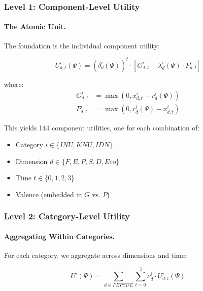 \subsubsection{Level 1: Component-Level Utility}

\paragraph{The Atomic Unit.}
The foundation is the individual component utility:

\begin{equation}
\boxed{
U^i_{d,t}(\Psi) = \left(\delta^i_d(\Psi)\right)^t \cdot \left[ G^i_{d,t} - \lambda^i_d(\Psi) \cdot P^i_{d,t} \right]
}
\label{eq:component-utility}
\end{equation}

where:
\begin{align*}
G^i_{d,t} &= \max\left(0, x^i_{d,t} - r^i_d(\Psi)\right) \\
P^i_{d,t} &= \max\left(0, r^i_d(\Psi) - x^i_{d,t}\right)
\end{align*}

This yields 144 component utilities, one for each combination of:
\begin{itemize}
\item Category $i \in \{INU, KNU, IDN\}$
\item Dimension $d \in \{F, E, P, S, D, Eco\}$
\item Time $t \in \{0, 1, 2, 3\}$
\item Valence (embedded in $G$ vs. $P$)
\end{itemize}

\subsubsection{Level 2: Category-Level Utility}

\paragraph{Aggregating Within Categories.}
For each category, we aggregate across dimensions and time:

\begin{equation}
U^i(\Psi) = \sum_{d \in FEPSDE} \sum_{t=0}^{3} \nu^i_d \cdot U^i_{d,t}(\Psi)
\label{eq:category-utility}
\end{equation}

